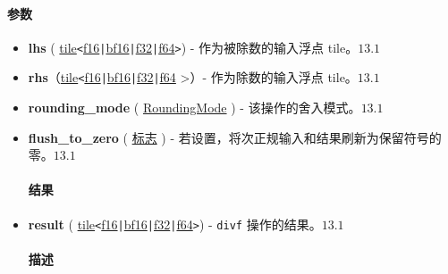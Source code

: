 \documentclass{article}
\begin{document}
\paragraph{参数}


\begin{itemize}
\item \textbf{lhs} ( \href{https://docs.nvidia.com/cuda/tile-ir/latest/sections/types.html#type-tile}{tile}\texttt{<}\href{https://docs.nvidia.com/cuda/tile-ir/latest/sections/types.html#subsection-element-types}{f16}\texttt{|}\href{https://docs.nvidia.com/cuda/tile-ir/latest/sections/types.html#subsection-element-types}{bf16}\texttt{|}\href{https://docs.nvidia.com/cuda/tile-ir/latest/sections/types.html#subsection-element-types}{f32}\texttt{|}\href{https://docs.nvidia.com/cuda/tile-ir/latest/sections/types.html#subsection-element-types}{f64}\texttt{>}) - 作为被除数的输入浮点 tile。$\boxed{13.1}$
\item \textbf{rhs}（\href{https://docs.nvidia.com/cuda/tile-ir/latest/sections/types.html#type-tile}{tile}\texttt{<}\href{https://docs.nvidia.com/cuda/tile-ir/latest/sections/types.html#subsection-element-types}{f16}\texttt{|}\href{https://docs.nvidia.com/cuda/tile-ir/latest/sections/types.html#subsection-element-types}{bf16}\texttt{|}\href{https://docs.nvidia.com/cuda/tile-ir/latest/sections/types.html#subsection-element-types}{f32}\texttt{|}\href{https://docs.nvidia.com/cuda/tile-ir/latest/sections/types.html#subsection-element-types}{f64} >）- 作为除数的输入浮点 tile。$\boxed{13.1}$
\item \textbf{rounding\_mode} ( \href{https://docs.nvidia.com/cuda/tile-ir/latest/sections/operations.html#op-attribute-cuda-tile-divf-roundingmode-attr}{RoundingMode} ) - 该操作的舍入模式。$\boxed{13.1}$
\item \textbf{flush\_to\_zero} ( \href{https://docs.nvidia.com/cuda/tile-ir/latest/sections/operations.html#type-flag}{标志} ) - 若设置，将次正规输入和结果刷新为保留符号的零。$\boxed{13.1}$




\paragraph{结果}


\item \textbf{result} ( \href{https://docs.nvidia.com/cuda/tile-ir/latest/sections/types.html#type-tile}{tile}\texttt{<}\href{https://docs.nvidia.com/cuda/tile-ir/latest/sections/types.html#subsection-element-types}{f16}\texttt{|}\href{https://docs.nvidia.com/cuda/tile-ir/latest/sections/types.html#subsection-element-types}{bf16}\texttt{|}\href{https://docs.nvidia.com/cuda/tile-ir/latest/sections/types.html#subsection-element-types}{f32}\texttt{|}\href{https://docs.nvidia.com/cuda/tile-ir/latest/sections/types.html#subsection-element-types}{f64}\texttt{>}) - \texttt{divf} 操作的结果。$\boxed{13.1}$




\paragraph{描述}


\end{itemize}
\end{document}
